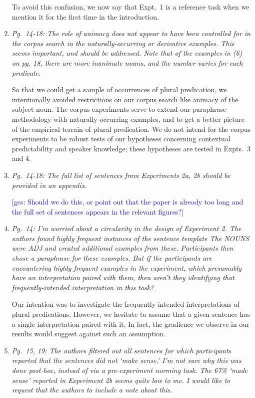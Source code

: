 \documentclass[12pt]{article}
\newcommand{\gcs}[1]{\textcolor{blue}{[gcs: #1]}}
\begin{document}
\begin{enumerate}
To avoid this confusion, we now say that Expt.~1 is a reference task when we mention it for the first time in the introduction.

\item \emph{Pg.~14-18: The role of animacy does not appear to have been controlled for in the corpus search in the naturally-occurring or derivative examples. This seems important, and should be addressed. Note that of the examples in (6) on pg. 18, there are more inanimate nouns, and the number varies for each predicate.}

So that we could get a sample of occurrences of plural predication, we intentionally avoided restrictions on our corpus search like animacy of the subject noun. The corpus experiments serve to extend our paraphrase methodology with naturally-occurring examples, and to get a better picture of the empirical terrain of plural predication. We do not intend for the corpus experiments to be robust tests of our hypotheses concerning contextual predictability and speaker knowledge; these hypotheses are tested in Expts.~3 and 4.

\item \emph{Pg.~14-18: The full list of sentences from Experiments 2a, 2b should be provided in an appendix.}

\gcs{Should we do this, or point out that the paper is already too long and the full set of sentences appears in the relevant figures?}

\item \emph{Pg.~14: I'm worried about a circularity in the design of Experiment 2. The authors found highly frequent instances of the sentence template \emph{The NOUNS were ADJ} and created additional examples from these. Participants then chose a paraphrase for these examples. But if the participants are encountering highly frequent examples in the experiment, which presumably have an interpretation paired with them, then aren't they identifying that frequently-intended interpretation in this task?}

Our intention was to investigate the frequently-intended interpretations of plural predications. However, we hesitate to assume that a given sentence has a single interpretation paired with it. In fact, the gradience we observe in our results would suggest against such an assumption.

\item \emph{Pg.~15, 19: The authors filtered out all sentences for which participants reported that the sentences did not `make sense.' I'm not sure why this was done post-hoc, instead of via a pre-experiment norming task. The 67\% `made sense' reported in Experiment 2b seems quite low to me. I would like to request that the authors to include a note about this.}


\end{enumerate}
\end{document}
